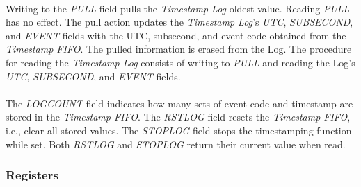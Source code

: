 \documentclass[openany]{article}
\begin{document}
			\paragraph{} Writing to the \emph{PULL} field pulls the \emph{Timestamp Log} oldest value. Reading \emph{PULL} has no effect. The pull action updates the \emph{Timestamp Log}'s \emph{UTC}, \emph{SUBSECOND}, and \emph{EVENT} fields with the UTC, subsecond, and event code obtained from the \emph{Timestamp FIFO}. The pulled information is erased from the Log. The procedure for reading the \emph{Timestamp Log} consists of writing to \emph{PULL} and reading the Log's \emph{UTC}, \emph{SUBSECOND}, and \emph{EVENT} fields.
			\paragraph{} The \emph{LOGCOUNT} field indicates how many sets of event code and timestamp are stored in the \emph{Timestamp FIFO}.
			The \emph{RSTLOG} field resets the \emph{Timestamp FIFO}, i.e., clear all stored values. The \emph{STOPLOG} field stops the timestamping function while set. Both \emph{RSTLOG} and \emph{STOPLOG} return their current value when read.

		\subsubsection{Registers}\label{sec:eve-registers}
\end{document}
